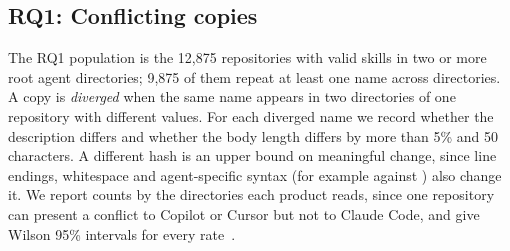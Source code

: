 \subsection{RQ1: Conflicting copies}

The RQ1 population is the 12,875 repositories with valid skills in two or more root agent directories; 9,875 of them repeat at least one name across directories. A copy is \emph{diverged} when the same name appears in two directories of one repository with different  values. For each diverged name we record whether the description differs and whether the body length differs by more than 5\% and 50 characters. A different hash is an upper bound on meaningful change, since line endings, whitespace and agent-specific syntax (for example  against ) also change it. We report counts by the directories each product reads, since one repository can present a conflict to Copilot or Cursor but not to Claude Code, and give Wilson 95\% intervals for every rate~\cite{wilson1927}.

